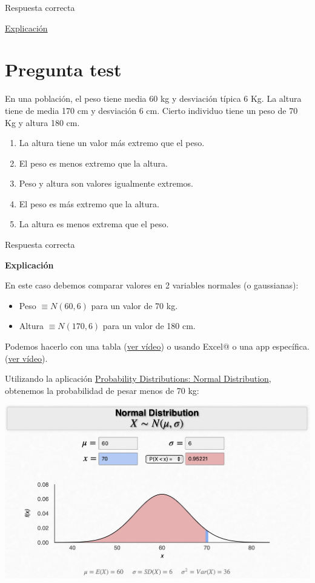 \documentclass[
]{book}
\providecommand{\tightlist}{%
  \setlength{\itemsep}{0pt}\setlength{\parskip}{0pt}}
\begin{document}
Respuesta correcta

\href{https://1fjmanzano.github.io/bioestadistica/contrastes-de-hipo\%CC\%81tesis.html}{Explicación}

\hypertarget{pregunta-test-107}{%
\section{Pregunta test}\label{pregunta-test-107}}

En una población, el peso tiene media 60 kg y desviación típica 6 Kg. La altura tiene de media 170 cm y desviación 6 cm. Cierto individuo tiene un peso de 70 Kg y altura 180 cm.

\begin{enumerate}
\def\labelenumi{\alph{enumi})}
\tightlist
\item
  La altura tiene un valor más extremo que el peso.
\item
  El peso es menos extremo que la altura.
\item
  Peso y altura son valores igualmente extremos.
\item
  El peso es más extremo que la altura.
\item
  La altura es menos extrema que el peso.
\end{enumerate}

Respuesta correcta

\textbf{Explicación}

En este caso debemos comparar valores en 2 variables normales (o gaussianas):

\begin{itemize}
\tightlist
\item
  Peso \(\equiv N(60, 6)\) para un valor de 70 kg.
\item
  Altura \(\equiv N(170, 6)\) para un valor de 180 cm.
\end{itemize}

Podemos hacerlo con una tabla (\href{https://youtu.be/xCBUdpIUx18}{ver vídeo}) o usando Excel@ o una app específica. (\href{https://youtu.be/rxkPlU1Ud7c}{ver vídeo}).

Utilizando la aplicación \href{https://homepage.divms.uiowa.edu/~mbognar/applets/normal.html}{Probability Distributions: Normal Distribution}, obtenemos la probabilidad de pesar menos de 70 kg:

\includegraphics[width=20.78in]{img/3_1}
\end{document}
